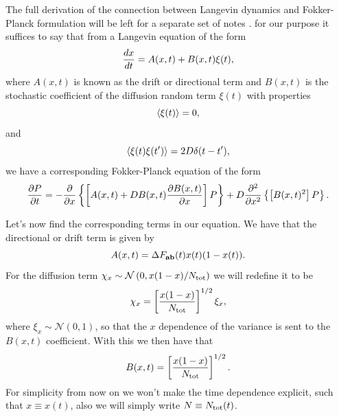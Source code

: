 The full derivation of the connection between Langevin dynamics and Fokker-
Planck formulation will be left for a separate set of notes . for our purpose it suffices to say that from a Langevin
equation of the form
\begin{equation}
  {d{x} \over dt} = A(x, t) + B(x, t) \xi(t),
\end{equation}
where $A(x, t)$ is known as the drift or directional term and $B(x, t)$ is the
stochastic coefficient of the diffusion random term $\xi(t)$ with properties
\begin{equation}
  \left\langle \xi(t) \right\rangle = 0,
\end{equation}
and
\begin{equation}
  \left\langle \xi(t) \xi(t') \right\rangle = 2D \delta(t - t'),
\end{equation}
we have a corresponding Fokker-Planck equation of the form
\begin{equation}
  {\partial P \over \partial t} = - {\partial \over \partial x}
  \left\{ \left[ A(x, t) + D B(x, t) {\partial B(x, t) \over \partial x}
  \right] P \right\} +
  D {\partial^2 \over \partial x^2} \left\{ \left[ B(x, t)^2 \right] P \right\}.
\end{equation}

Let's now find the corresponding terms in our equation. We have that the
directional or drift term is given by
\begin{equation}
  A(x, t) = \Delta F_{\mathbf{ab}}(t) x(t) (1 - x(t)).
\end{equation}
For the diffusion term $\chi_x \sim \mathcal{N} \left( 0, x(1-x)/N_{\text{tot}} \right)$
we will redefine it to be
\begin{equation}
  \chi_x = \left[ {x (1 - x) \over N_{\text{tot}}} \right]^{1/2} \xi_x,
\end{equation}
where $\xi_x \sim \mathcal{N}(0, 1)$, so that the $x$ dependence of the variance
is sent to the $B(x, t)$ coefficient. With this we then have that
\begin{equation}
  B(x, t) = \left[ {x (1 - x) \over N_{\text{tot}}} \right]^{1/2}.
\end{equation}
For simplicity from now on we won't make the time dependence explicit, such that
$x \equiv x(t)$, also we will simply write $N \equiv N_{\text{tot}}(t)$.


